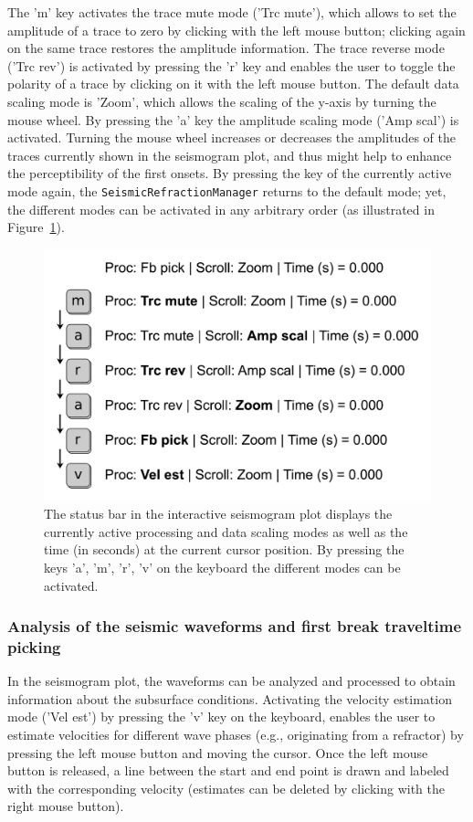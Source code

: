 \documentclass[a4paper,fleqn]{cas-sc}
\begin{document}
The 'm' key activates the trace mute mode ('Trc mute'), which allows to set the amplitude of a trace to zero by clicking with the left mouse button; clicking again on the same trace restores the amplitude information. The trace reverse mode ('Trc rev') is activated by pressing the 'r' key and enables the user to toggle the polarity of a trace by clicking on it with the left mouse button. 
The default data scaling mode is 'Zoom', which allows the scaling of the y-axis by turning the mouse wheel. By pressing the 'a' key the amplitude scaling mode ('Amp scal') is activated. Turning the mouse wheel increases or decreases the amplitudes of the traces currently shown in the seismogram plot, and thus might help to enhance the perceptibility of the first onsets.
By pressing the key of the currently active mode again, the \texttt{SeismicRefractionManager} returns to the default mode; yet, the different modes can be activated in any arbitrary order (as illustrated in Figure~\ref{fig:statusbar_intro}).
\begin{figure}
	\centering
	\includegraphics[width=.75\textwidth]{figures/status_bar.pdf}
	\caption{The status bar in the interactive seismogram plot displays the currently active processing and data scaling modes as well as the time (in seconds) at the current cursor position. By pressing the keys 'a', 'm', 'r', 'v' on the keyboard the different modes can be activated.}
	\label{fig:statusbar_intro}
\end{figure}

\subsubsection{Analysis of the seismic waveforms and first break traveltime picking}

In the seismogram plot, the waveforms can be analyzed and processed to obtain information about the subsurface conditions. Activating the velocity estimation mode ('Vel est') by pressing the 'v' key on the keyboard, enables the user to estimate velocities for different wave phases (e.g., originating from a refractor) by pressing the left mouse button and moving the cursor. Once the left mouse button is released, a line between the start and end point is drawn and labeled with the corresponding velocity (estimates can be deleted by clicking with the right mouse button).
\end{document}
